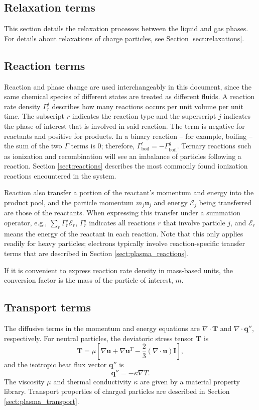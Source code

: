 \subsection{Relaxation terms}
This section details the relaxation processes between the liquid and gas phases. For details about relaxations of charge particles, see Section \ref{sect:relaxations}.

\subsection{Reaction terms}
Reaction and phase change are used interchangeably in this document, since the same chemical species of different states are treated as different fluids. A reaction rate density $\Gamma_r^j$ describes how many
reactions occurs per unit volume per unit time. The subscript $r$ indicates the reaction type and the superscript $j$ indicates the phase of interest that is involved in said reaction. The term is negative for
reactants and positive for products. In a binary reaction -- for example, boiling -- the sum of the two $\Gamma$ terms is 0; therefore, $\Gamma_{\text{boil}}^l = -\Gamma_{\text{boil}}^g$. Ternary reactions such as
ionization and recombination will see an imbalance of particles following a reaction. Section \ref{sect:reactions} describes the most commonly found ionization reactions encountered in the system.

Reaction also transfer a portion of the reactant's momentum and energy into the product pool, and the particle momentum $m_j \mathbf{u}_j$ and energy $\mathcal{E}_j$ being transferred are those of the reactants.
When expressing this transfer under a summation operator, e.g., $\displaystyle \sum_{r} \Gamma_r^j \mathcal{E}_r$, $\Gamma_r^j$ indicates all reactions $r$ that involve particle $j$, and $\mathcal{E}_r$ means the
energy of the reactant in each reaction. Note that this only applies readily for heavy particles; electrons typically involve reaction-specific transfer terms that are described in Section \ref{sect:plasma_reactions}.

If it is convenient to express reaction rate density in mass-based units, the conversion factor is the mass of the particle of interest, $m$.

\subsection{Transport terms}
The diffusive terms in the momentum and energy equations are $\nabla \cdot \mathbf{T}$ and $\nabla \cdot \mathbf{q}''$, respectively. For neutral particles, the deviatoric stress tensor $\mathbf{T}$ is
\begin{equation}
    \mathbf{T} = \mu \left[ \nabla\mathbf{u} + \nabla\mathbf{u}^T - \frac{2}{3} (\nabla\cdot\mathbf{u})\mathbf{I} \right],
\end{equation}
and the isotropic heat flux vector $\mathbf{q}''$ is
\begin{equation}
    \mathbf{q}'' = -\kappa\nabla T.
\end{equation}
The viscosity $\mu$ and thermal conductivity $\kappa$ are given by a material property library. Transport properties of charged particles are described in Section \ref{sect:plasma_transport}.

